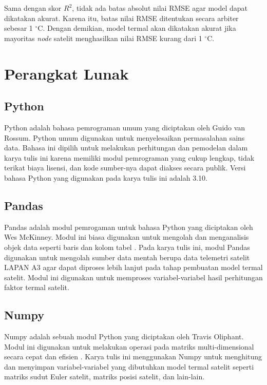 Sama dengan skor $R^2$, tidak ada batas absolut nilai RMSE agar model dapat
dikatakan akurat. Karena itu, batas nilai RMSE ditentukan secara arbiter sebesar 1 $^\circ$C. Dengan demikian, model termal akan dikatakan akurat jika mayoritas \textit{node} satelit menghasilkan nilai RMSE kurang dari 1 $^\circ$C.

\section{Perangkat Lunak}

\subsection{Python}

Python adalah bahasa pemrograman umum yang diciptakan oleh Guido van
Rossum. Python umum digunakan untuk menyelesaikan permasalahan sains
data. Bahasa ini dipilih untuk melakukan perhitungan dan
pemodelan dalam karya tulis ini karena memiliki modul pemrograman yang
cukup lengkap, tidak terikat biaya lisensi, dan kode sumber-nya dapat
diakses secara publik. Versi bahasa Python yang digunakan pada karya
tulis ini adalah 3.10.

\subsection{Pandas}

Pandas adalah modul pemrogaman untuk bahasa Python yang diciptakan oleh Wes
McKinney. Modul ini biasa digunakan untuk mengolah dan menganalisis objek data
seperti baris dan kolom tabel \cite{reback2022}. Pada karya tulis ini, modul Pandas
digunakan untuk mengolah sumber data mentah berupa data telemetri satelit LAPAN
A3 agar dapat diproses lebih lanjut pada tahap pembuatan model termal satelit. Modul ini digunakan untuk memproses variabel-variabel hasil perhitungan faktor termal satelit.

\subsection{Numpy}

Numpy adalah sebuah modul Python yang diciptakan oleh Travis Oliphant. Modul
ini digunakan untuk melakukan operasi pada matriks multi-dimensional secara
cepat dan efisien \cite{harris2020}. Karya tulis ini menggunakan Numpy untuk
menghitung dan menyimpan variabel-variabel yang dibutuhkan model termal satelit
seperti matriks sudut Euler satelit, matriks posisi satelit, dan lain-lain. 

